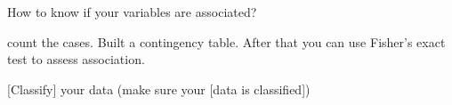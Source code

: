 
\Problem

How to know if your variables are associated?

\Solution

count the cases. Built a contingency table. After that you can use Fisher’s exact test to assess association.

\RelatedPatterns

[Classify] your data (make sure your [data is classified])